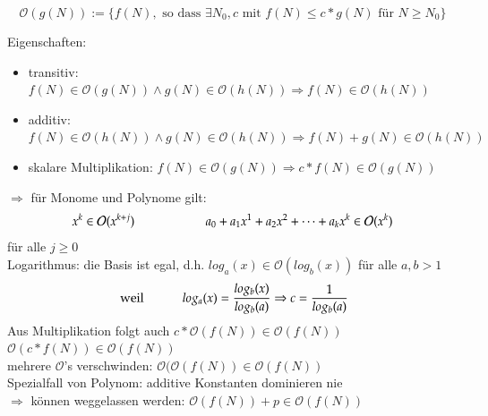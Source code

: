 \[\mathcal O(g(N)) := \biggl\lbrace f(N), \text{ so dass } \exists N_0, c \text{ mit } f(N) \leq c * g(N) \text{ für } N \geq N_0 \biggr\rbrace\]

Eigenschaften:
\begin{itemize}
    \item transitiv: $f(N) \in \mathcal O(g(N)) \land g(N) \in \mathcal O(h(N)) \Rightarrow f(N) \in \mathcal O(h(N))$
    \item additiv: $f(N) \in \mathcal O(h(N)) \land g(N) \in \mathcal O(h(N)) \Rightarrow f(N) + g(N) \in \mathcal O(h(N))$
    \item skalare Multiplikation: $f(N) \in \mathcal O(g(N)) \Rightarrow c* f(N) \in \mathcal O(g(N)) $
\end{itemize}

$\Rightarrow$ für Monome und Polynome gilt:
\[ x^k \in \mathcal O(x^{k+j}) \hspace*{2cm} a_0 + a_1x^1 + a_2x^2 + \dots + a_kx^k \in \mathcal O(x^k)\]
für alle $j \geq 0$ \\
Logarithmus: die Basis ist egal, d.h. $log_a(x) \in \mathcal O(log_b(x))$ für alle $a,b >1$
\[ \text{ weil  }\hspace*{1cm} log_a(x) = \frac{log_b(x)}{log_b(a)} \Rightarrow c = \frac{1}{log_b(a)}\]
Aus Multiplikation folgt auch\hspace*{1cm} $c* \mathcal O(f(N)) \in \mathcal O(f(N))$ \\
\hspace*{6cm} $\mathcal O(c*f(N)) \in \mathcal O(f(N))$ \\

mehrere $\mathcal O$'s verschwinden: $ \mathcal O( \mathcal O(f(N)) \in \mathcal O (f(N))$ \\

Spezialfall von Polynom: additive Konstanten dominieren nie \\
\hspace*{1cm}$\Rightarrow$ können weggelassen werden: $\mathcal O(f(N)) + p \in \mathcal O(f(N))$

